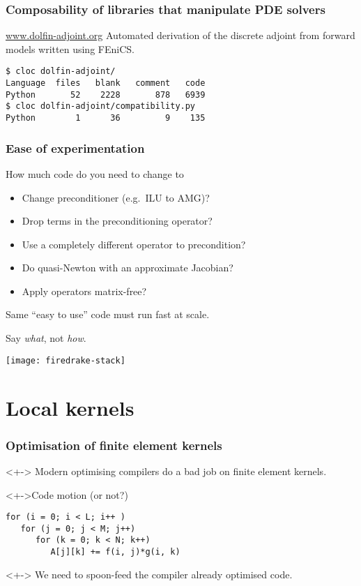 \documentclass[presentation]{beamer}
\begin{document}
\begin{frame}[fragile]
  \frametitle{Composability of libraries that manipulate PDE solvers}
  \begin{block}{\url{www.dolfin-adjoint.org}}
    Automated derivation of the discrete adjoint from forward models
    written using FEniCS.

\begin{verbatim}
$ cloc dolfin-adjoint/
Language  files   blank   comment   code
Python       52    2228       878   6939
$ cloc dolfin-adjoint/compatibility.py
Python        1      36         9    135
\end{verbatim}
  \end{block}
\end{frame}

\begin{frame}
  \frametitle{Ease of experimentation}
  How much code do you need to change to
  \begin{itemize}
  \item Change preconditioner (e.g.~ILU to AMG)?
  \item Drop terms in the preconditioning operator?
  \item Use a completely different operator to precondition?
  \item Do quasi-Newton with an approximate Jacobian?
  \item Apply operators matrix-free?
  \end{itemize}

  Same ``easy to use'' code must run fast at scale.
\end{frame}

\begin{frame}[standout]
  Say \emph{what}, not \emph{how}.
\end{frame}

\begin{frame}
  \texttt{[image: firedrake-stack]}
\end{frame}

\section{Local kernels}

\begin{frame}[fragile]
  \frametitle{Optimisation of finite element kernels}
  
  \begin{problem}<+->
    Modern optimising compilers do a bad job on finite element
    kernels.
  \end{problem}
  \begin{exampleblock}<+->{Code motion (or not?)}
\begin{verbatim}
for (i = 0; i < L; i++ )
   for (j = 0; j < M; j++)
      for (k = 0; k < N; k++)
         A[j][k] += f(i, j)*g(i, k)
\end{verbatim}
  \end{exampleblock}
  \begin{corollary}<+->
    We need to spoon-feed the compiler already optimised code.
  \end{corollary}
\end{frame}
\end{document}
